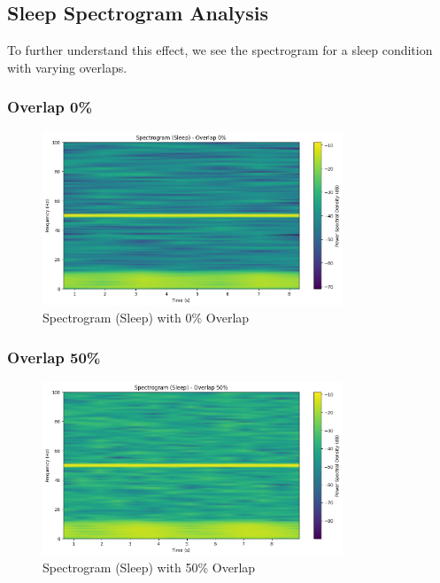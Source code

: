 \documentclass[10pt]{article}
\theoremstyle{definition}
\theoremstyle{remark}
\theoremstyle{definition}
\numberwithin{equation}{prob}
\begin{document}
\subsection{Sleep Spectrogram Analysis}

To further understand this effect, we see the spectrogram for a sleep condition with varying overlaps.

\subsubsection{Overlap 0\%}
\begin{figure}[H]
    \centering
    \includegraphics[width=0.8\textwidth]{./figures/Spectrogram (Sleep) - Overlap 0.png}
    \caption{Spectrogram (Sleep) with 0\% Overlap}
    \label{fig:sleep_0_overlap}
\end{figure}

\subsubsection{Overlap 50\%}
\begin{figure}[H]
    \centering
    \includegraphics[width=0.8\textwidth]{./figures/Spectrogram (Sleep) - Overlap 50.png}
    \caption{Spectrogram (Sleep) with 50\% Overlap}
    \label{fig:sleep_50_overlap}
\end{figure}
\end{document}

